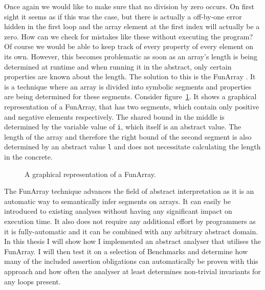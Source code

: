 \noindent Once again we would like to make sure that no division by zero occurs. On first sight it seems as if this was the case, but there is actually a off-by-one error hidden in the first loop and the array element at the first index will actually be a zero.
How can we check for mistakes like these without executing the program? Of course we would be able to keep track of every property of every element on its own. However, this becomes problematic as soon as an array's length is being determined at runtime and when running it in the abstract, only certain properties are known about the length. The solution to this is the FunArray \cite{cousot2011}. It is a technique where an array is divided into symbolic segments and properties are being determined for these segments. Consider figure~\ref{fig:funarray}. It shows a graphical representation of a FunArray, that has two segments, which contain only positive and negative elements respectively. The shared bound in the middle is determined by the variable value of \texttt{i}, which itself is an abstract value. The length of the array and therefore the right bound of the second segment is also determined by an abstract value \texttt{l} and does not necessitate calculating the length in the concrete.

\begin{figure}[!htb]
\vspace{0.2cm}
\begin{center}
\end{center}
\caption{A graphical representation of a FunArray.} \label{fig:funarray}

\end{figure}

\noindent The FunArray technique advances the field of abstract interpretation as it is an automatic way to semantically infer segments on arrays. It can easily be introduced to existing analyses without having any significant impact on execution time. It also does not require any additional effort by programmers as it is fully-automatic and it can be combined with any arbitrary abstract domain. In this thesis I will show how I implemented an abstract analyser that utilises the FunArray. I will then test it on a selection of Benchmarks and determine how many of the included assertion obligations can automatically be proven with this approach and how often the analyser at least determines non-trivial invariants for any loops present.




